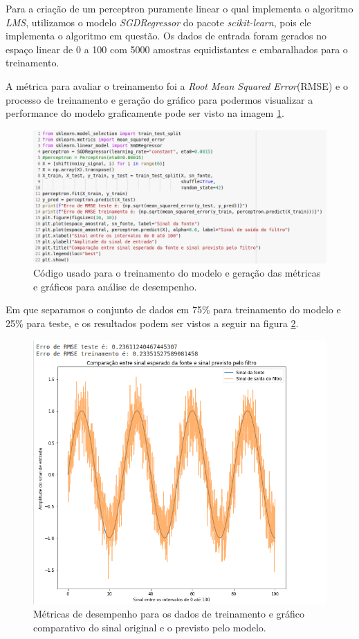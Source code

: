 \documentclass[a4paper, 12pt]{article}
\begin{document}
Para a criação de um perceptron puramente linear o qual implementa o algoritmo \textit{LMS}, utilizamos o modelo \textit{SGDRegressor} do pacote \textit{scikit-learn}, pois ele implementa o algoritmo em questão. Os dados de entrada foram gerados no espaço linear de 0 a 100 com 5000 amostras equidistantes e embaralhados para o treinamento.

A métrica para avaliar o treinamento foi a \textit{Root Mean Squared Error}(RMSE) e o processo de treinamento e geração do gráfico para podermos visualizar a performance do modelo graficamente pode ser visto na imagem \ref{fig:quest6_code}.

\begin{figure}[h]
	\centering
 	\includegraphics[width=0.8\linewidth]{figuras/quest6_code.png}
    \caption{Código usado para o treinamento do modelo e geração das métricas e gráficos para análise de desempenho.}
    \label{fig:quest6_code}
\end{figure}
\FloatBarrier

Em que separamos o conjunto de dados em 75\% para treinamento do modelo e 25\% para teste, e os resultados podem ser vistos a seguir na figura \ref{fig:quest6_saida}.

\begin{figure}[h]
	\centering
 	\includegraphics[width=0.8\linewidth]{figuras/quest6_saida.png}
    \caption{Métricas de desempenho para os dados de treinamento e gráfico comparativo do sinal original e o previsto pelo modelo.}
    \label{fig:quest6_saida}
\end{figure}
\FloatBarrier
\end{document}
